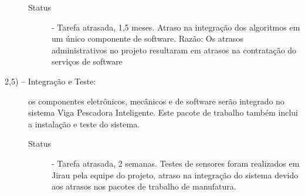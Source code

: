 \begin{description}
\begin{description}
	\item [Status] - Tarefa atrasada, 1,5 meses. Atraso na integração dos algoritmos em um único componente de software. Razão: Os atrasos administrativos no projeto resultaram em atrasos na contratação do serviços de software
\end{description} 

\item[2,5) – Integração e Teste:] os componentes eletrônicos, mecânicos e de software serão integrado no sistema Viga Pescadora Inteligente. Este pacote de trabalho também inclui a instalação e teste do sistema.

\begin{description}
	\item [Status] - Tarefa atrasada, 2 semanas. Testes de sensores foram realizados em Jirau pela equipe do projeto, atraso na integração do sistema devido aos atrasos nos pacotes de trabalho de manufatura.  
\end{description} 

\end{description}


